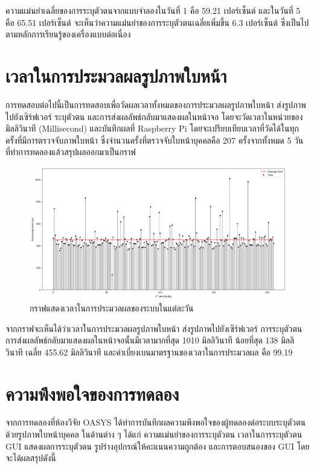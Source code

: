 \indent ความแม่นยำเฉลี่ยของการระบุตัวตนจากแบบจำลองในวันที่ 1 คือ 59.21 เปอร์เซ็นต์ และในวันที่ 5 คือ 65.51 เปอร์เซ็นต์ จะเห็นว่าความแม่นยำของการระบุตัวตนเฉลี่ยเพิ่มขึ้น 6.3 เปอร์เซ็นต์ 
ซึ่งเป็นไปตามหลักการเรียนรู้ของเครื่องแบบต่อเนื่อง



\section{เวลาในการประมวลผลรูปภาพใบหน้า}
การทดสอบต่อไปนี้เป็นการทดสอบเพื่อวัดผลเวลาทั้งหมดของการประมวลผลรูปภาพใบหน้า ส่งรูปภาพไปยังเซิร์ฟเวอร์ ระบุตัวตน และการส่งผลลัพธ์กลับมาแสดงผลในหน้าจอ
โดยจะวัดเวลาในหน่วยของมิลลิวินาที (Millisecond) และบันทึกผลที่ Raspberry Pi โดยจะเปรียบเทียบเวลาที่วัดได้ในทุกครั้งที่มีการตรวจจับภาพใบหน้า 
ซึ่งจำนวนครั้งที่ตรวจจับใบหน้าบุคคลคือ 207 ครั้งจากทั้งหมด 5 วันที่ทำการทดลองแล้วสรุปผลออกมาเป็นกราฟ
  
\begin{figure}[!ht]
  \begin{center}
    \includegraphics[scale=.4]{pic/Time_1.png}
    \caption[กราฟแสดงเวลาในการประมวลผลของระบบในแต่ละวัน]{กราฟแสดงเวลาในการประมวลผลของระบบในแต่ละวัน}
    \label{fig:time_graph}
  \end{center}
\end{figure}
\newpage
\indent จากกราฟจะเห็นได้ว่าเวลาในการประมวลผลรูปภาพใบหน้า ส่งรูปภาพไปยังเซิร์ฟเวอร์ การระบุตัวตน การส่งผลลัพธ์กลับมาแสดงผลในหน้าจอนั้นมีเวลามากที่สุด 1010 มิลลิวินาที 
น้อยที่สุด 138 มิลลิวินาที เฉลี่ย 455.62 มิลลิวินาที และค่าเบี่ยงเบนมาตรฐานของเวลาในการประมวลผล คือ 99.19



\section{ความพึงพอใจของการทดลอง}
จากการทดลองที่ห้องวิจัย OASYS ได้ทำการบันทึกผลความพึงพอใจของผู้ทดลองต่อระบบระบุตัวตนด้วยรูปภาพใบหน้าบุคคล ในด้านต่าง ๆ ได้แก่ 
ความแม่นยำของการระบุตัวตน เวลาในการระบุตัวตน GUI แสดงผลการระบุตัวตน รูปร่างอุปกรณ์ให้คะแนนความถูกต้อง และการตอบสนองของ GUI โดยจะได้ผลสรุปดังนี้

